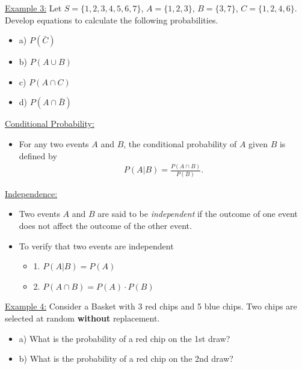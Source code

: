 \documentclass[handout]{ximera}
\newcommand {\bs} {\begin{eqnarray*}}
\newcommand {\es} {\end{eqnarray*}}
\newcommand {\bi} {\begin{itemize}}
\newcommand {\ei} {\end{itemize}}
\begin{document}
\vspace{1.5in}

 \item[] \underline{Example 3:} Let $S = \{1,2,3,4,5,6,7\}$, $A = \{1,2,3\}$, $B = \{3,7\}$, $C = \{1,2,4,6\}$. Develop equations to calculate the following probabilities.
     \bi
      \item[a)] $P(\bar{C})$

       \vspace{1.75in}

      \item[b)] $P(A \cup B)$

       \vspace{1.75in}

      \item[c)] $P(A \cap C)$

       \vspace{1.75in}

      \item[d)] $P(A \cap \bar{B})$

       \vspace{1.75in}
     \ei


 \item \underline{Conditional Probability:}
   \bi
    \item For any two events $A$ and $B$, the conditional probability of $A$ given $B$ is defined by
      \bs
        P(A|B) = \frac{P(A \cap B)} {P(B)}.
      \es

    \vspace{2.25in}
   \ei
 \item \underline{Independence:}
  \bi
   \item Two events $A$ and $B$ are said to be \textit{independent} if the outcome of one event does not affect the outcome of the other event.
   \item To verify that two events are independent
     \bi
      \item[1.] $P(A|B) = P(A)$
      \item[2.] $P(A \cap B) = P(A) \cdot P(B)$
     \ei
  \ei

\vspace{.2in}

\newpage

\item[] \underline{Example 4:} Consider a Basket with 3 red chips and 5 blue chips. Two chips are selected at random \textbf{without} replacement.
     \bi
      \item[a)] What is the probability of a red chip on the 1st draw?
       \vspace{1.95in}
      \item[b)] What is the probability of a red chip on the 2nd draw?
        \vspace{1.95in}
     \ei
\end{document}
